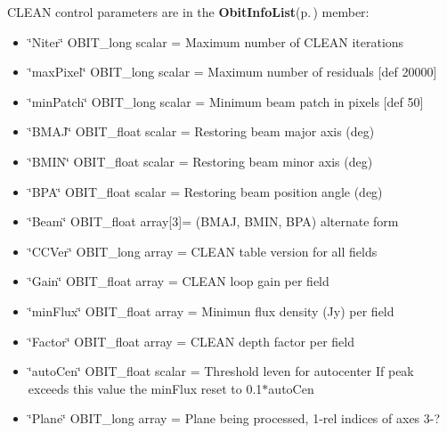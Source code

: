 CLEAN control parameters are in the {\bf Obit\-Info\-List}{\rm (p.\,\pageref{structObitInfoList})} member: \begin{itemize}
\item \char`\"{}Niter\char`\"{} OBIT\_\-long scalar = Maximum number of CLEAN iterations \item \char`\"{}max\-Pixel\char`\"{} OBIT\_\-long scalar = Maximum number of residuals [def 20000] \item \char`\"{}min\-Patch\char`\"{} OBIT\_\-long scalar = Minimum beam patch in pixels [def 50] \item \char`\"{}BMAJ\char`\"{} OBIT\_\-float scalar = Restoring beam major axis (deg) \item \char`\"{}BMIN\char`\"{} OBIT\_\-float scalar = Restoring beam minor axis (deg) \item \char`\"{}BPA\char`\"{} OBIT\_\-float scalar = Restoring beam position angle (deg) \item \char`\"{}Beam\char`\"{} OBIT\_\-float array[3]= (BMAJ, BMIN, BPA) alternate form \item \char`\"{}CCVer\char`\"{} OBIT\_\-long array = CLEAN table version for all fields \item \char`\"{}Gain\char`\"{} OBIT\_\-float array = CLEAN loop gain per field \item \char`\"{}min\-Flux\char`\"{} OBIT\_\-float array = Minimun flux density (Jy) per field \item \char`\"{}Factor\char`\"{} OBIT\_\-float array = CLEAN depth factor per field \item \char`\"{}auto\-Cen\char`\"{} OBIT\_\-float scalar = Threshold leven for autocenter If peak exceeds this value the min\-Flux reset to 0.1$\ast$auto\-Cen \item \char`\"{}Plane\char`\"{} OBIT\_\-long array = Plane being processed, 1-rel indices of axes 3-? 
\end{itemize}
